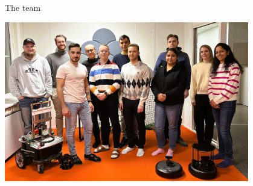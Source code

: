 
\begin{frame}{The team}

    \begin{adjustbox}{scale=1,center,margin={0cm,0cm,0cm,0cm}}
        \includegraphics[width=0.8\textwidth]{image/jpg/team_picture.jpg}
    \end{adjustbox}
    
\end{frame}

